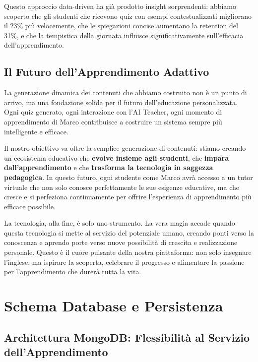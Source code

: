 \documentclass[12pt,a4paper]{article}
\begin{document}
Questo approccio data-driven ha già prodotto insight sorprendenti: abbiamo scoperto che gli studenti che ricevono quiz con esempi contestualizzati migliorano il 23\% più velocemente, che le spiegazioni concise aumentano la retention del 31\%, e che la tempistica della giornata influisce significativamente sull'efficacia dell'apprendimento.

\subsection{Il Futuro dell'Apprendimento Adattivo}
\label{subsec:future-adaptive}

La generazione dinamica dei contenuti che abbiamo costruito non è un punto di arrivo, ma una fondazione solida per il futuro dell'educazione personalizzata. Ogni quiz generato, ogni interazione con l'AI Teacher, ogni momento di apprendimento di Marco contribuisce a costruire un sistema sempre più intelligente e efficace.

Il nostro obiettivo va oltre la semplice generazione di contenuti: stiamo creando un ecosistema educativo che \textbf{evolve insieme agli studenti}, che \textbf{impara dall'apprendimento} e che \textbf{trasforma la tecnologia in saggezza pedagogica}. In questo futuro, ogni studente come Marco avrà accesso a un tutor virtuale che non solo conosce perfettamente le sue esigenze educative, ma che cresce e si perfeziona continuamente per offrire l'esperienza di apprendimento più efficace possibile.

La tecnologia, alla fine, è solo uno strumento. La vera magia accade quando questa tecnologia si mette al servizio del potenziale umano, creando ponti verso la conoscenza e aprendo porte verso nuove possibilità di crescita e realizzazione personale. Questo è il cuore pulsante della nostra piattaforma: non solo insegnare l'inglese, ma ispirare la scoperta, celebrare il progresso e alimentare la passione per l'apprendimento che durerà tutta la vita.

\section{Schema Database e Persistenza}
\label{sec:database-schema}

\subsection{Architettura MongoDB: Flessibilità al Servizio dell'Apprendimento}
\label{subsec:mongodb-architecture}
\end{document}
